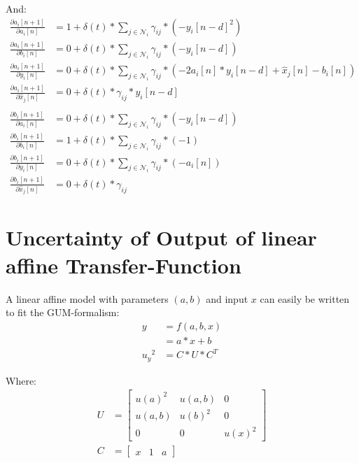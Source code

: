 \documentclass[10pt,a4paper,onecolumn]{article}
\begin{document}
    And:
    \begin{align}
        \frac{\partial a_i[n+1]}{\partial a_i[n]} &= 1 + \delta(t) * \sum_{j \in \mathcal{N}_i} \gamma_{ij} * (- {y_i}[n-d]^2) \\
        \frac{\partial a_i[n+1]}{\partial b_i[n]} &= 0 + \delta(t) * \sum_{j \in \mathcal{N}_i} \gamma_{ij} * (- y_i[n-d]) \\
        \frac{\partial a_i[n+1]}{\partial y_i[n]} &= 0 + \delta(t) * \sum_{j \in \mathcal{N}_i} \gamma_{ij} * (-2 a_i[n] * y_i[n-d] + \hat{x}_j[n] - b_i[n]) \\
        \frac{\partial a_i[n+1]}{\partial \hat{x}_j[n]} &= 0 + \delta(t) * \gamma_{ij} * y_i[n-d]\\
        \nonumber\\
        \frac{\partial b_i[n+1]}{\partial a_i[n]} &= 0 + \delta(t) * \sum_{j \in \mathcal{N}_i} \gamma_{ij} * (- y_i[n-d]) \\
        \frac{\partial b_i[n+1]}{\partial b_i[n]} &= 1 + \delta(t) * \sum_{j \in \mathcal{N}_i} \gamma_{ij} * (- 1) \\
        \frac{\partial b_i[n+1]}{\partial y_i[n]} &= 0 + \delta(t) * \sum_{j \in \mathcal{N}_i} \gamma_{ij} * (- a_i[n]) \\
        \frac{\partial b_i[n+1]}{\partial \hat{x}_j[n]} &= 0 + \delta(t) * \gamma_{ij}
    \end{align}    
    
    \section{Uncertainty of Output of linear affine Transfer-Function}
    A linear affine model with parameters $(a,b)$ and input $x$ can easily be written to fit the GUM-formalism:
    \begin{align}
        y &= f(a,b,x) \label{eq:linear_affine_model}\\
        &= a*x + b \\
        {u_y}^2 &= C * U * C^T
    \end{align}
    
    Where:
    \begin{align}
        U &=  
        \begin{bmatrix}
            u(a)^2 & u(a, b) & 0 \\
            u(a, b) & u(b)^2 & 0 \\
            0 & 0 & u(x)^2 
        \end{bmatrix} \\
        C &= \begin{bmatrix} x & 1 & a \end{bmatrix}
    \end{align}
    
\end{document}
